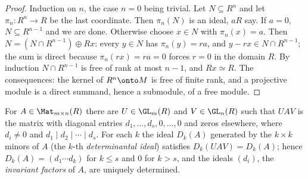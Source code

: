 \begin{proof}
Induction on $n$, the case $n=0$ being trivial. Let $N\subseteq R^n$ and let $\pi_n\colon R^n\to R$ be the last coordinate. Then
$\pi_n(N)$ is an ideal, $aR$ say. If $a=0$, $N\subseteq R^{n-1}$ and we are done. Otherwise choose $x\in N$ with $\pi_n(x)=a$. Then
$N=(N\cap R^{n-1})\oplus Rx$: every $y\in N$ has $\pi_n(y)=ra$, and $y-rx\in N\cap R^{n-1}$; the sum is direct because $\pi_n(rx)=ra=0$
forces $r=0$ in the domain $R$. By induction $N\cap R^{n-1}$ is free of rank at most $n-1$, and $Rx\simeq R$. The consequences: the
kernel of $R^n\onto M$ is free of finite rank, and a projective module is a direct summand, hence a submodule, of a free module.
\end{proof}

\begin{theorem}\label{thm:modules:smith}
For $A\in\Mat_{m\times n}(R)$ there are $U\in\GL_m(R)$ and $V\in\GL_n(R)$ such that $UAV$ is the matrix with diagonal entries
$d_1,\dots,d_s,0,\dots,0$ and zeros elsewhere, where $d_i\ne0$ and $d_1\mid d_2\mid\cdots\mid d_s$. For each $k$ the ideal $D_k(A)$ generated by the
$k\times k$ minors of $A$ (the $k$-th \emph{determinantal ideal}) satisfies $D_k(UAV)=D_k(A)$; hence $D_k(A)=(d_1\cdots d_k)$ for $k\le s$
and $0$ for $k>s$, and the ideals $(d_i)$, the \emph{invariant factors} of $A$, are uniquely determined.
\end{theorem}


